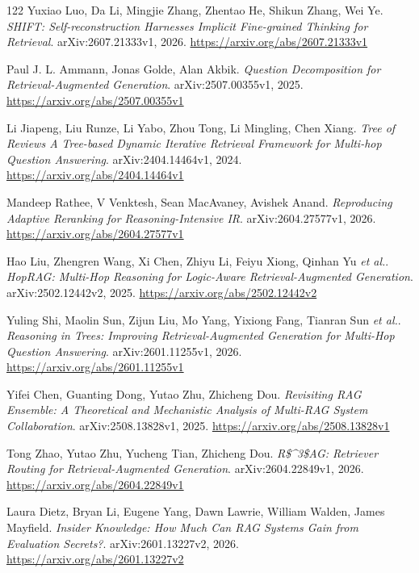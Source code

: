 \documentclass[11pt,a4paper]{article}
\begin{document}
\begin{thebibliography}{122}
Yuxiao Luo, Da Li, Mingjie Zhang, Zhentao He, Shikun Zhang, Wei Ye.
\newblock \emph{SHIFT: Self-reconstruction Harnesses Implicit Fine-grained Thinking for Retrieval}.
\newblock arXiv:2607.21333v1, 2026.
\newblock \url{https://arxiv.org/abs/2607.21333v1}

Paul J. L. Ammann, Jonas Golde, Alan Akbik.
\newblock \emph{Question Decomposition for Retrieval-Augmented Generation}.
\newblock arXiv:2507.00355v1, 2025.
\newblock \url{https://arxiv.org/abs/2507.00355v1}

Li Jiapeng, Liu Runze, Li Yabo, Zhou Tong, Li Mingling, Chen Xiang.
\newblock \emph{Tree of Reviews A Tree-based Dynamic Iterative Retrieval Framework for Multi-hop Question Answering}.
\newblock arXiv:2404.14464v1, 2024.
\newblock \url{https://arxiv.org/abs/2404.14464v1}

Mandeep Rathee, V Venktesh, Sean MacAvaney, Avishek Anand.
\newblock \emph{Reproducing Adaptive Reranking for Reasoning-Intensive IR}.
\newblock arXiv:2604.27577v1, 2026.
\newblock \url{https://arxiv.org/abs/2604.27577v1}

Hao Liu, Zhengren Wang, Xi Chen, Zhiyu Li, Feiyu Xiong, Qinhan Yu \emph{et al.}.
\newblock \emph{HopRAG: Multi-Hop Reasoning for Logic-Aware Retrieval-Augmented Generation}.
\newblock arXiv:2502.12442v2, 2025.
\newblock \url{https://arxiv.org/abs/2502.12442v2}

Yuling Shi, Maolin Sun, Zijun Liu, Mo Yang, Yixiong Fang, Tianran Sun \emph{et al.}.
\newblock \emph{Reasoning in Trees: Improving Retrieval-Augmented Generation for Multi-Hop Question Answering}.
\newblock arXiv:2601.11255v1, 2026.
\newblock \url{https://arxiv.org/abs/2601.11255v1}

Yifei Chen, Guanting Dong, Yutao Zhu, Zhicheng Dou.
\newblock \emph{Revisiting RAG Ensemble: A Theoretical and Mechanistic Analysis of Multi-RAG System Collaboration}.
\newblock arXiv:2508.13828v1, 2025.
\newblock \url{https://arxiv.org/abs/2508.13828v1}

Tong Zhao, Yutao Zhu, Yucheng Tian, Zhicheng Dou.
\newblock \emph{R\$\textasciicircum{}3\$AG: Retriever Routing for Retrieval-Augmented Generation}.
\newblock arXiv:2604.22849v1, 2026.
\newblock \url{https://arxiv.org/abs/2604.22849v1}

Laura Dietz, Bryan Li, Eugene Yang, Dawn Lawrie, William Walden, James Mayfield.
\newblock \emph{Insider Knowledge: How Much Can RAG Systems Gain from Evaluation Secrets?}.
\newblock arXiv:2601.13227v2, 2026.
\newblock \url{https://arxiv.org/abs/2601.13227v2}


\end{thebibliography}
\end{document}
